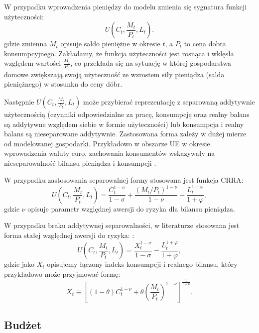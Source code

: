 W przypadku wprowadzenia pieniędzy do modelu zmienia się sygnatura funkcji użyteczności:
\begin{equation}
    U\left(C_t, \frac{M_t}{P_t}, L_t\right).
\end{equation}
gdzie zmienna $M_t$ opisuje saldo pieniężne w okresie $t$, a $P_t$ to cena dobra konsumpcyjnego. Zakładamy, że funkcja użyteczności jest rosnąca i wklęsła względem wartości $\frac{M_t}{P_t}$, co przekłada się na sytuację w której gospodarstwa domowe zwiększają swoją użyteczność ze wzrostem siły pieniądza (salda pieniężnego) w stosunku do ceny dóbr.

Następnie $U(C_t, \frac{M_t}{P_t}, L_t)$ może przybierać reprezentację z separowaną addytywnie użytecznością (czynniki odpowiedzialne za pracę, konsumpcję oraz realny balans są addytywne względem siebie w formie użyteczności) lub konsumpcja i realny balans są nieseparowane addytywnie. Zastosowana forma zależy w dużej mierze od modelowanej gospodarki. Przykładowo w obszarze UE w okresie wprowadzenia waluty euro, zachowania konsumentów wskazywały na nieseparowalność bilansu pieniądza i konsumpcji \cite{RePEc:ecb:ecbwps:2006704}. 

W przypadku zastosowania separowalnej formy stosowana jest funkcja CRRA:
\begin{equation}
    U\left(C_t, \frac{M_t}{P_t}, L_t\right) = \frac{C^{1-\sigma}_t}{1-\sigma} + \frac{(M_t/P_t)^{1-\nu}}{1-\nu} - \frac{L_t^{1+\varphi}}{1+\varphi},
\end{equation}
gdzie $\nu$ opisuje parametr względnej awersji do ryzyka dla bilansu pieniądza.

W przypadku braku addytywnej separowalności, w literaturze stosowana jest forma stałej względnej awersji do ryzyka: \cite{gali}:
\begin{equation}
        U\left(C_t, \frac{M_t}{P_t}, L_t\right) = \frac{X^{1-\sigma}_t}{1-\sigma} - \frac{L_t^{1+\varphi}}{1+\varphi},
\end{equation}
gdzie jako $X_t$ opisujemy łączony indeks konsumpcji i  realnego bilansu, który przykładowo może przyjmować formę:
\begin{equation*}
    X_t \equiv \left[\left(1-\theta\right)C_t^{1-\nu} + \theta\left(\frac{M_t}{P_t}\right)^{1-\nu}\right]^{\frac{1}{1-\nu}}.
\end{equation*}

\subsection{Budżet}

